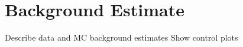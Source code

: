 \graphicspath{{Chapters/BackgroundEstimate/Figures/}}
\chapter{Background Estimate}
\label{chap:BackgroundEstimate}
Describe data and MC background estimates
Show control plots

